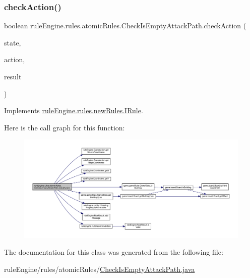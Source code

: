 \subsubsection{\texorpdfstring{check\+Action()}{checkAction()}}
{\footnotesize\ttfamily boolean rule\+Engine.\+rules.\+atomic\+Rules.\+Check\+Is\+Empty\+Attack\+Path.\+check\+Action (\begin{DoxyParamCaption}\item[{\mbox{\hyperlink{classgame_1_1game_state_1_1_game_state}{Game\+State}}}]{state,  }\item[{\mbox{\hyperlink{classrule_engine_1_1_game_action}{Game\+Action}}}]{action,  }\item[{\mbox{\hyperlink{classrule_engine_1_1_rule_result}{Rule\+Result}}}]{result }\end{DoxyParamCaption})\hspace{0.3cm}{\ttfamily [inline]}}



Implements \mbox{\hyperlink{interfacerule_engine_1_1rules_1_1new_rules_1_1_i_rule_a72ce29a47d7a5fba75a09444a50a481e}{rule\+Engine.\+rules.\+new\+Rules.\+I\+Rule}}.

Here is the call graph for this function\+:
\nopagebreak
\begin{figure}[H]
\begin{center}
\leavevmode
\includegraphics[width=350pt]{classrule_engine_1_1rules_1_1atomic_rules_1_1_check_is_empty_attack_path_a60ed32ecc147e0e79ce7800e2769e9da_cgraph}
\end{center}
\end{figure}


The documentation for this class was generated from the following file\+:\begin{DoxyCompactItemize}
\item 
rule\+Engine/rules/atomic\+Rules/\mbox{\hyperlink{_check_is_empty_attack_path_8java}{Check\+Is\+Empty\+Attack\+Path.\+java}}\end{DoxyCompactItemize}
